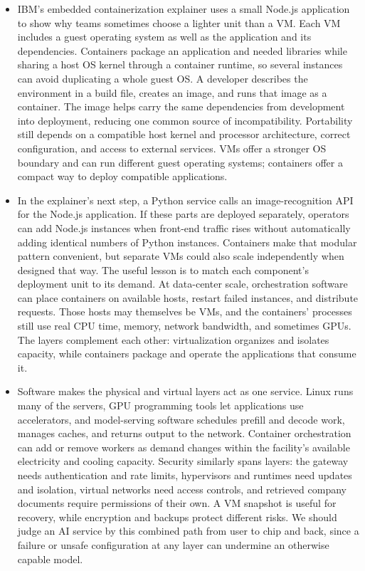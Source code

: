 \documentclass[10pt]{article}
\begin{document}
\begin{itemize}[leftmargin=1.25em, itemsep=0.3em, parsep=0pt, topsep=0pt]
    \item IBM's embedded containerization explainer uses a small Node.js application to show why teams sometimes choose a lighter unit than a VM. Each VM includes a guest operating system as well as the application and its dependencies. Containers package an application and needed libraries while sharing a host OS kernel through a container runtime, so several instances can avoid duplicating a whole guest OS. A developer describes the environment in a build file, creates an image, and runs that image as a container. The image helps carry the same dependencies from development into deployment, reducing one common source of incompatibility. Portability still depends on a compatible host kernel and processor architecture, correct configuration, and access to external services. VMs offer a stronger OS boundary and can run different guest operating systems; containers offer a compact way to deploy compatible applications.

    \item In the explainer's next step, a Python service calls an image-recognition API for the Node.js application. If these parts are deployed separately, operators can add Node.js instances when front-end traffic rises without automatically adding identical numbers of Python instances. Containers make that modular pattern convenient, but separate VMs could also scale independently when designed that way. The useful lesson is to match each component's deployment unit to its demand. At data-center scale, orchestration software can place containers on available hosts, restart failed instances, and distribute requests. Those hosts may themselves be VMs, and the containers' processes still use real CPU time, memory, network bandwidth, and sometimes GPUs. The layers complement each other: virtualization organizes and isolates capacity, while containers package and operate the applications that consume it.

    \item Software makes the physical and virtual layers act as one service. Linux runs many of the servers, GPU programming tools let applications use accelerators, and model-serving software schedules prefill and decode work, manages caches, and returns output to the network. Container orchestration can add or remove workers as demand changes within the facility's available electricity and cooling capacity. Security similarly spans layers: the gateway needs authentication and rate limits, hypervisors and runtimes need updates and isolation, virtual networks need access controls, and retrieved company documents require permissions of their own. A VM snapshot is useful for recovery, while encryption and backups protect different risks. We should judge an AI service by this combined path from user to chip and back, since a failure or unsafe configuration at any layer can undermine an otherwise capable model.


\end{itemize}
\end{document}
